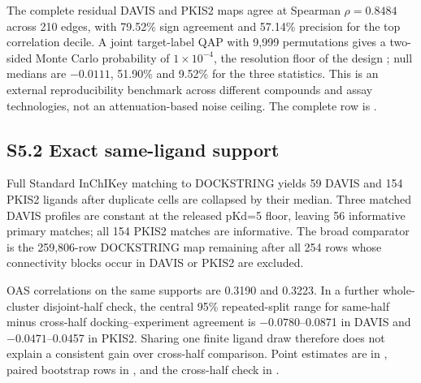 \documentclass[11pt]{article}
\begin{document}
The complete residual DAVIS and PKIS2 maps agree at Spearman $\rho=0.8484$
across 210 edges, with 79.52\% sign agreement and 57.14\% precision for the top
correlation decile. A joint target-label QAP with 9,999 permutations gives a
two-sided Monte Carlo probability of $1\times10^{-4}$, the resolution floor of
the design \cite{hubert1976}; null medians are $-0.0111$, 51.90\% and 9.52\%
for the three statistics. This is an external reproducibility
benchmark across different compounds and assay technologies, not an
attenuation-based noise ceiling. The complete row is
.

\subsection*{S5.2 Exact same-ligand support}

Full Standard InChIKey matching to DOCKSTRING yields 59 DAVIS and 154 PKIS2
ligands after duplicate cells are collapsed by their median. Three matched
DAVIS profiles are constant at the released pKd=5 floor, leaving 56 informative
primary matches; all 154 PKIS2 matches are informative. The broad comparator is
the 259,806-row DOCKSTRING map remaining after all 254 rows whose connectivity
blocks occur in DAVIS or PKIS2 are excluded.

\begin{table}[htbp]
\centering
\caption{Docking--experiment residual-map agreement on the primary informative
exact matches and on the chemically de-leaked broad DOCKSTRING reference.
Bootstrap brackets are paired Butina-cluster 95\% perturbation ranges for the
same-minus-broad difference, not target-population confidence intervals.}
\label{tab:s5same}
\small
{}
\end{table}

OAS correlations on the same supports are 0.3190 and 0.3223. In a further
whole-cluster disjoint-half check, the central 95\% repeated-split range for
same-half minus cross-half docking--experiment agreement is
$-0.0780$--0.0871 in DAVIS and $-0.0471$--0.0457 in PKIS2. Sharing one finite
ligand draw therefore does not explain a consistent gain over cross-half
comparison. Point estimates are in
, paired
bootstrap rows in
, and the
cross-half check in
.
\end{document}
